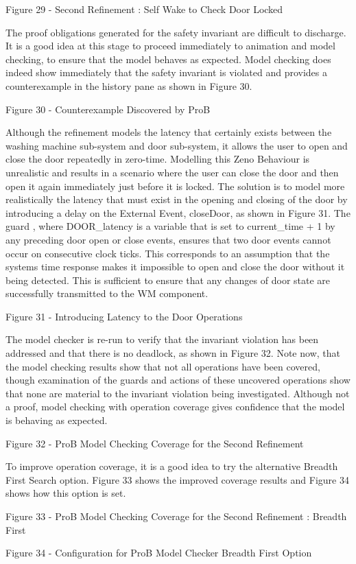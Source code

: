 Figure 29 - Second Refinement : Self Wake to Check Door Locked

The proof obligations generated for the safety invariant are difficult to discharge. It is a good idea at this stage to proceed immediately to animation and model checking, to ensure that the model behaves as expected.
Model checking does indeed show immediately that the safety invariant is violated and provides a counterexample in the history pane as shown in Figure 30.
 
Figure 30 - Counterexample Discovered by ProB

Although the refinement models the latency that certainly exists between the washing machine sub-system and door sub-system, it allows the user to open and close the door repeatedly in zero-time. Modelling this Zeno Behaviour is unrealistic and results in a scenario where the user can close the door and then open it again immediately just before it is locked.
The solution is to model more realistically the latency that must exist in the opening and closing of the door by introducing a delay on the External Event, closeDoor, as shown in Figure 31. The guard  \textbf{}, where DOOR\_latency is a variable that is set to current\_time + 1 by any preceding door open or close events, ensures that two door events cannot occur on consecutive clock ticks. This corresponds to an assumption that the systems time response makes it impossible to open and close the door without it being detected. This is sufficient to ensure that any changes of door state are successfully transmitted to the WM component.
 
Figure 31 - Introducing Latency to the Door Operations
 
The model checker is re-run to verify that the invariant violation has been addressed and that there is no deadlock, as shown in Figure 32. Note now, that the model checking results show that not all operations have been covered, though examination of the guards and actions of these uncovered operations show that none are material to the invariant violation being investigated. Although not a proof, model checking with operation coverage gives confidence that the model is behaving as expected.
 
Figure 32 - ProB Model Checking Coverage for the Second Refinement 
 
To improve operation coverage, it is a good idea to try the alternative Breadth First Search option. Figure 33 shows the improved coverage results and Figure 34 shows how this option is set.
 
Figure 33 - ProB Model Checking Coverage for the Second Refinement : Breadth First
 
Figure 34 - Configuration for ProB Model Checker Breadth First Option
 

